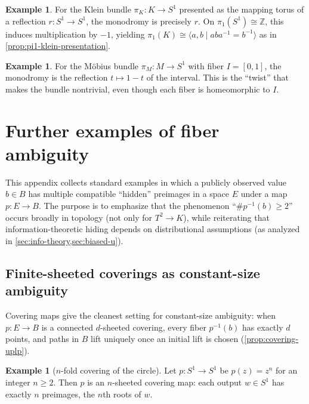 \documentclass[11pt,a4paper]{article}
\theoremstyle{definition}
\newtheorem{example}[theorem]{Example}
\theoremstyle{remark}
\begin{document}
\begin{example}
\label{ex:monodromy-klein}
For the Klein bundle \(\pi_K:K\to S^1\) presented as the mapping torus of a reflection \(r:S^1\to S^1\), the monodromy is precisely \(r\). On \(\pi_1(S^1)\cong \mathbb{Z}\), this induces multiplication by \(-1\), yielding \(\pi_1(K)\cong \langle a,b\mid aba^{-1}=b^{-1}\rangle\) as in \cref{prop:pi1-klein-presentation}.
\end{example}

\begin{example}
\label{ex:monodromy-mobius}
For the Möbius bundle \(\pi_M:M\to S^1\) with fiber \(I=[0,1]\), the monodromy is the reflection \(t\mapsto 1-t\) of the interval. This is the ``twist'' that makes the bundle nontrivial, even though each fiber is homeomorphic to \(I\).
\end{example}

\section{Further examples of fiber ambiguity}
\label{sec:appendix-examples}

This appendix collects standard examples in which a publicly observed value \(b\in B\) has multiple compatible ``hidden'' preimages in a space \(E\) under a map \(p:E\to B\). The purpose is to emphasize that the phenomenon ``\(\#p^{-1}(b)\ge 2\)'' occurs broadly in topology (not only for \(T^2\to K\)), while reiterating that information-theoretic hiding depends on distributional assumptions (as analyzed in \cref{sec:info-theory,sec:biased-u}).

\subsection{Finite-sheeted coverings as constant-size ambiguity}
\label{sec:appendix-finite-coverings}

Covering maps give the cleanest setting for constant-size ambiguity: when \(p:E\to B\) is a connected \(d\)-sheeted covering, every fiber \(p^{-1}(b)\) has exactly \(d\) points, and paths in \(B\) lift uniquely once an initial lift is chosen (\cref{prop:covering-uplp}).

\begin{example}[\(n\)-fold covering of the circle]
\label{ex:nfold-circle}
Let \(p:S^1\to S^1\) be \(p(z)=z^n\) for an integer \(n\ge 2\). Then \(p\) is an \(n\)-sheeted covering map: each output \(w\in S^1\) has exactly \(n\) preimages, the \(n\)th roots of \(w\).
\end{example}
\end{document}
